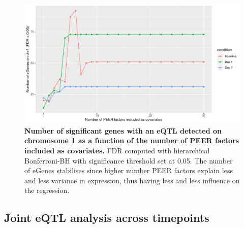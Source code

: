 \begin{figure}
    \centering
    \includegraphics[width=1.0\textwidth,page=1]{mainmatter/figures/chapter_03/count_eGenes.signif_eGenes_vs_PEER_n.dataset_mega.chr_chr1.pdf}
    \caption[
    ]{
        \textbf{Number of significant genes with an \gls{eQTL} detected on chromosome 1 as a function of the number of PEER factors included as covariates.}
        \gls{FDR} computed with hierarchical Bonferroni-\gls{BH} \autocite{huang2018PowerFalseDiscovery} with significance threshold set at 0.05.
        The number of eGenes stabilises since higher number PEER factors explain less and less variance in expression, thus having less and less influence on the regression.
    }
    \label{fig:hird_neGenesvsPeerK}
\end{figure}

\subsection{Joint eQTL analysis across timepoints}
\label{subsec:hird_reQTL_mashr}

